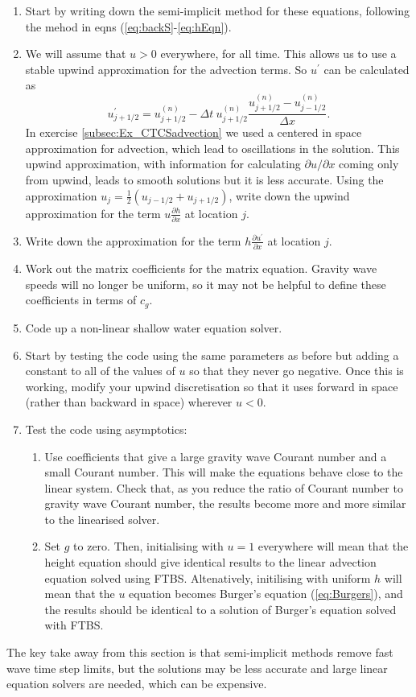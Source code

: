 \begin{enumerate}
\begin{enumerate}
\item Start by writing down the semi-implicit method for these equations,
following the mehod in eqns (\ref{eq:backS}-\ref{eq:hEqn}).
\item We will assume that $u>0$ everywhere, for all time. This allows us
to use a stable upwind approximation for the advection terms. So $u^{\prime}$
can be calculated as
\begin{equation}
u_{j+1/2}^{\prime}=u_{j+1/2}^{(n)}-\Delta t\ u_{j+1/2}^{(n)}\frac{u_{j+1/2}^{(n)}-u_{j-1/2}^{(n)}}{\Delta x}.
\end{equation}
In exercise \ref{subsec:Ex_CTCSadvection} we used a centered in space
approximation for advection, which lead to oscillations in the solution.
This upwind approximation, with information for calculating $\partial u/\partial x$
coming only from upwind, leads to smooth solutions but it is less
accurate. Using the approximation $u_{j}=\frac{1}{2}\left(u_{j-1/2}+u_{j+1/2}\right)$,
write down the upwind approximation for the term $u\frac{\partial h}{\partial x}$
at location $j$.
\item Write down the approximation for the term $h\frac{\partial u^{\prime}}{\partial x}$
at location $j$.
\item Work out the matrix coefficients for the matrix equation. Gravity
wave speeds will no longer be uniform, so it may not be helpful to
define these coefficients in terms of $c_{g}$. 
\item Code up a non-linear shallow water equation solver.
\item Start by testing the code using the same parameters as before but
adding a constant to all of the values of $u$ so that they never
go negative. Once this is working, modify your upwind discretisation
so that it uses forward in space (rather than backward in space) wherever
$u<0$.
\item Test the code using asymptotics:
\begin{enumerate}
\item Use coefficients that give a large gravity wave Courant number and
a small Courant number. This will make the equations behave close
to the linear system. Check that, as you reduce the ratio of Courant
number to gravity wave Courant number, the results become more and
more similar to the linearised solver. 
\item Set $g$ to zero. Then, initialising with $u=1$ everywhere will mean
that the height equation should give identical results to the linear
advection equation solved using FTBS. Altenatively, initilising with
uniform $h$ will mean that the $u$ equation becomes Burger's equation
(\ref{eq:Burgers}), and the results should be identical to a solution
of Burger's equation solved with FTBS. 
\end{enumerate}
\end{enumerate}
\end{enumerate}
The key take away from this section is that semi-implicit methods
remove fast wave time step limits, but the solutions may be less accurate
and large linear equation solvers are needed, which can be expensive.

